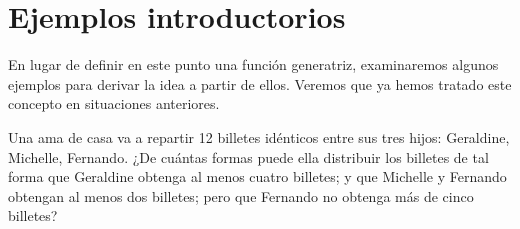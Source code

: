 \section{Ejemplos introductorios}

En lugar de definir en este punto una función generatriz, examinaremos algunos ejemplos para derivar la idea a partir de ellos. Veremos que ya hemos tratado este concepto en situaciones anteriores.

\begin{myexample}
    Una ama de casa va a repartir 12 billetes idénticos entre sus tres hijos: Geraldine, Michelle, Fernando. ¿De cuántas formas puede ella distribuir los billetes de tal forma que Geraldine obtenga al menos cuatro billetes; y que Michelle y Fernando obtengan al menos dos billetes; pero que Fernando no obtenga más de cinco billetes?


\end{myexample}
